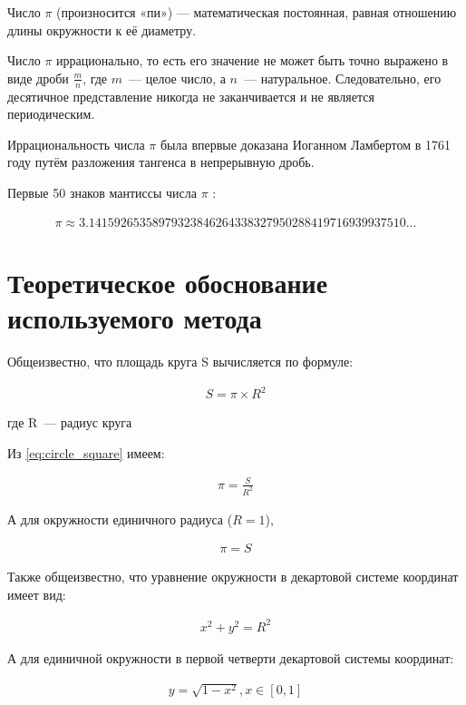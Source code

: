 \documentclass[a4paper,12pt]{article}
\begin{document}
Число $\pi$ (произносится «пи») — математическая постоянная, равная отношению длины окружности к её диаметру.

Число $\pi$ иррационально, то есть его значение не может быть точно выражено в виде дроби 
$ \frac {m}{n}$, где 
$m$~--- целое число, а $n$~--- натуральное. Следовательно, его десятичное представление никогда не заканчивается и не является периодическим. 

Иррациональность числа $\pi$ была впервые доказана Иоганном Ламбертом в 1761 году путём разложения тангенса в непрерывную дробь.

Первые 50 знаков мантиссы числа $\pi$ \cite[Википедия]{wiki}:

\begin{align}\label{eq:pi_50}
\pi \approx 3.14159265358979323846264338327950288419716939937510\ldots
\end{align}

\pagebreak

\section{Теоретическое обоснование используемого метода}

Общеизвестно, что площадь круга S вычисляется по формуле:

\begin{align}\label{eq:circle_square}
    S = \pi \times R^2
\end{align}

где R~--- радиус круга

Из \ref{eq:circle_square} имеем:

\begin{align}\label{eq:pi1}
\pi = \frac{S}{R^2} 
\end{align}

А для окружности единичного радиуса ($R = 1$),

\begin{align}\label{eq:pi}
    \pi = S
\end{align}

Также общеизвестно, что уравнение окружности в декартовой системе координат имеет вид:

\begin{align}\label{eq:circle}
    x^2 + y^2 = R^2
\end{align}

А для единичной окружности в первой четверти декартовой системы координат:

\begin{align}\label{eq:y}
    y = \sqrt{1-x^2}, x \in [0,1]
\end{align}
\end{document}
